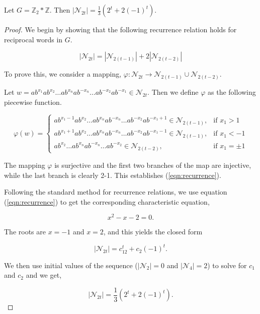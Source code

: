 \documentclass[10pt,a4paper]{amsart}
\begin{document}
\begin{prop}\label{prop:recurrence}
	Let $G=\mathbb{Z}_2\ast\mathbb{Z}$.  Then  
	$|\mathcal{N}_{2t}|=\frac{1}{3}(2^{t}+2(-1)^{t})$.
\end{prop}

\begin{proof}
	We begin by showing that the following recurrence relation holds for reciprocal words in $G$.

\begin{equation}\label{eqn:recurrence}
|\mathcal{N}_{2t}|=|\mathcal{N}_{2(t-1)}|+2|\mathcal{N}_{2(t-2)}|
\end{equation}

To prove this, we consider a mapping, $\varphi: \mathcal{N}_{2t}\to\mathcal{N}_{2(t-1)}\cup\mathcal{N}_{2(t-2)}$.  

Let $w=ab^{x_1}ab^{x_2}\dots ab^{x_n}ab^{-x_n}\dots ab^{-x_2}ab^{-x_1}\in\mathcal{N}_{2t}$.  Then we define $\varphi$ as the following piecewise function.

\begin{equation}\label{eqn:phimap}
\varphi(w)=
\begin{cases}
ab^{x_1-1}ab^{x_2}\dots ab^{x_n}ab^{-x_n}\dots ab^{-x_2}ab^{-x_1+1}\in\mathcal{N}_{2(t-1)}, & \text{if}\,\, x_1>1\\
ab^{x_1+1}ab^{x_2}\dots ab^{x_n}ab^{-x_n}\dots ab^{-x_2}ab^{-x_1-1}\in\mathcal{N}_{2(t-1)}, & \text{if}\,\, x_1<-1\\
ab^{x_2}\dots ab^{x_n}ab^{-x_n}\dots ab^{-x_2}\in\mathcal{N}_{2(t-2)}, & \text{if}\,\, x_1=\pm 1
\end{cases}
\end{equation}

The mapping $\varphi$ is surjective and the first two branches  of the map are injective, while the last branch  is clearly 2-1.  This establishes (\ref{eqn:recurrence}).




	Following the standard method for recurrence relations, we use equation (\ref{eqn:recurrence}) to get the corresponding characteristic equation,  
	
	\begin{equation*}
	x^2 - x - 2 = 0.
	\end{equation*}
	
	The roots are $ x =-1 $ and $ x =2  $, and this yields the closed form
	
	\begin{equation*}
	|\mathcal{N}_{2t}| = c_12^t + c_2(-1)^t.
	\end{equation*}
	
	We then use initial values of the sequence ($|\mathcal{N}_2|=0$ and $|\mathcal{N}_4|=2$) to solve for $c_1$ and $c_2$ and we get,
	
	\begin{equation}\label{eqn:recwordcount}
	|\mathcal{N}_{2t}|=\frac{1}{3}\left(2^t+2(-1)^t\right).
	\end{equation}
	\end{proof}
\end{document}
